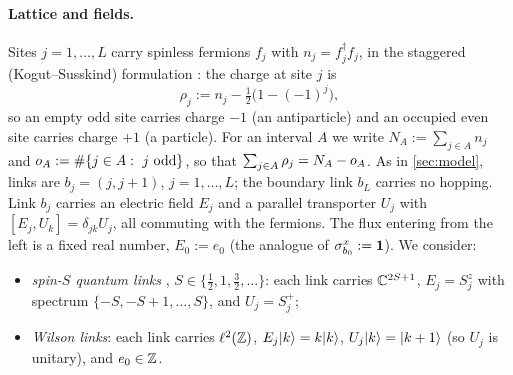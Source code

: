 \paragraph{Lattice and fields.}
Sites $j=1,\dots,L$ carry spinless fermions $f_j$ with $n_j=f_j^\dagger f_j$, in the staggered
(Kogut--Susskind) formulation \cite{KogutSusskind1975}: the charge at site $j$ is
\begin{equation}\label{eq:rho}
  \rho_j:=n_j-\tfrac12\bigl(1-(-1)^j\bigr),
\end{equation}
so an empty odd site carries charge $-1$ (an antiparticle) and an occupied even site carries charge $+1$ (a
particle).  For an interval $A$ we write $N_A:=\sum_{j\in A}n_j$ and $o_A:=\#\{j\in A:\ j\text{ odd}\}$, so that
$\sum_{j\in A}\rho_j=N_A-o_A$.  As in \cref{sec:model}, links are $b_j=(j,j+1)$, $j=1,\dots,L$; the boundary
link $b_L$ carries no hopping.  Link $b_j$ carries an electric field $E_j$ and a parallel transporter $U_j$
with $[E_j,U_k]=\delta_{jk}U_j$, all commuting with the fermions.  The flux entering from the left is a fixed
real number, $E_0:=e_0$ (the analogue of $\sigma^x_{b_0}:=\mathbf{1}$).  We consider:
\begin{itemize}
\item \emph{spin-$S$ quantum links} \cite{ChandrasekharanWiese1997}, $S\in\{\frac12,1,\frac32,\dots\}$: each link
carries $\mathbb{C}^{2S+1}$, $E_j=S^z_j$ with spectrum $\{-S,-S+1,\dots,S\}$, and $U_j=S^+_j$;
\item \emph{Wilson links}: each link carries $\ell^2(\mathbb{Z})$, $E_j|k\rangle=k|k\rangle$, $U_j|k\rangle=|k+1\rangle$ (so $U_j$ is
unitary), and $e_0\in\mathbb{Z}$.
\end{itemize}

